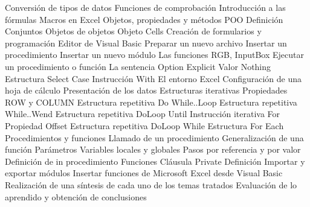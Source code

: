Conversión de tipos de datos
Funciones de comprobación
Introducción a las fórmulas
Macros en Excel
Objetos, propiedades y métodos
POO
Definición
Conjuntos
Objetos de objetos
Objeto Cells
Creación de formularios y programación
Editor de Visual Basic
Preparar un nuevo archivo
Insertar un procedimiento
Insertar un nuevo módulo
Las funciones RGB, InputBox
Ejecutar un procedimiento o función
La sentencia Option Explicit
Valor Nothing
Estructura Select Case
Instrucción With
El entorno Excel
Configuración de una hoja de cálculo
Presentación de los datos
Estructuras iterativas
Propiedades ROW y COLUMN
Estructura repetitiva Do While..Loop
Estructura repetitiva While..Wend
Estructura repetitiva DoLoop Until
Instrucción iterativa For
Propiedad Offset
Estructura repetitiva DoLoop While
Estructura For Each
Procedimientos y funciones
Llamado de un procedimiento
Generalización de una función
Parámetros
Variables locales y globales
Pasos por referencia y por valor
Definición de in procedimiento
Funciones
Cláusula Private
Definición
Importar y exportar módulos
Insertar funciones de Microsoft Excel desde Visual Basic
Realización de una síntesis de cada uno de los temas tratados
Evaluación de lo aprendido y obtención de conclusiones